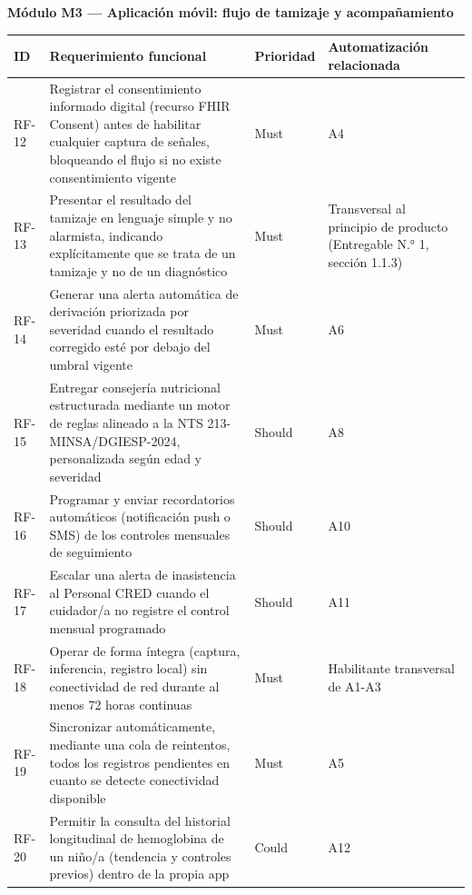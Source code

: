 \documentclass[11pt,a4paper]{article}
\begin{document}
\textbf{Módulo M3 --- Aplicación móvil: flujo de tamizaje y acompañamiento}

{\small
\begin{longtable}[]{@{}
  >{\raggedright\arraybackslash}p{}
  >{\raggedright\arraybackslash}p{}
  >{\raggedright\arraybackslash}p{}
  >{\raggedright\arraybackslash}p{}@{}}
\toprule\noalign{}
\begin{minipage}[b]{\linewidth}\raggedright
ID
\end{minipage} & \begin{minipage}[b]{\linewidth}\raggedright
Requerimiento funcional
\end{minipage} & \begin{minipage}[b]{\linewidth}\raggedright
Prioridad
\end{minipage} & \begin{minipage}[b]{\linewidth}\raggedright
Automatización relacionada
\end{minipage} \\
\midrule\noalign{}
\endhead
\bottomrule\noalign{}
\endlastfoot
RF-12 & Registrar el consentimiento informado digital (recurso FHIR Consent) antes de habilitar cualquier captura de señales, bloqueando el flujo si no existe consentimiento vigente & Must & A4 \\
RF-13 & Presentar el resultado del tamizaje en lenguaje simple y no alarmista, indicando explícitamente que se trata de un tamizaje y no de un diagnóstico & Must & Transversal al principio de producto (Entregable N.° 1, sección 1.1.3) \\
RF-14 & Generar una alerta automática de derivación priorizada por severidad cuando el resultado corregido esté por debajo del umbral vigente & Must & A6 \\
RF-15 & Entregar consejería nutricional estructurada mediante un motor de reglas alineado a la NTS 213-MINSA/DGIESP-2024, personalizada según edad y severidad & Should & A8 \\
RF-16 & Programar y enviar recordatorios automáticos (notificación push o SMS) de los controles mensuales de seguimiento & Should & A10 \\
RF-17 & Escalar una alerta de inasistencia al Personal CRED cuando el cuidador/a no registre el control mensual programado & Should & A11 \\
RF-18 & Operar de forma íntegra (captura, inferencia, registro local) sin conectividad de red durante al menos 72 horas continuas & Must & Habilitante transversal de A1-A3 \\
RF-19 & Sincronizar automáticamente, mediante una cola de reintentos, todos los registros pendientes en cuanto se detecte conectividad disponible & Must & A5 \\
RF-20 & Permitir la consulta del historial longitudinal de hemoglobina de un niño/a (tendencia y controles previos) dentro de la propia app & Could & A12 \\
\end{longtable}
}
\end{document}
